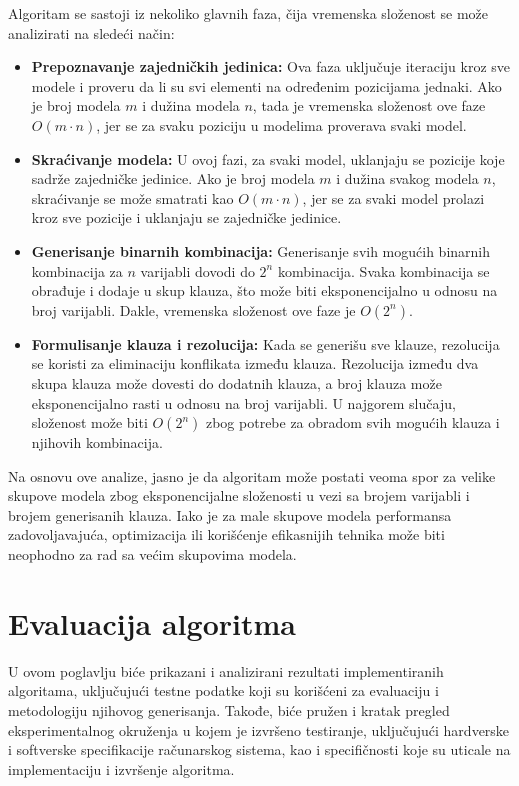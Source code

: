 \documentclass[12pt,oneside]{memoir}
\begin{document}
Algoritam se sastoji iz nekoliko glavnih faza, čija vremenska složenost se može analizirati na sledeći način:

\begin{itemize}
    \item \textbf{Prepoznavanje zajedničkih jedinica:} Ova faza uključuje iteraciju kroz sve modele i proveru da li su svi elementi na određenim pozicijama jednaki. Ako je broj modela \( m \) i dužina modela \( n \), tada je vremenska složenost ove faze \( O(m \cdot n) \), jer se za svaku poziciju u modelima proverava svaki model.
    
    \item \textbf{Skraćivanje modela:} U ovoj fazi, za svaki model, uklanjaju se pozicije koje sadrže zajedničke jedinice. Ako je broj modela \( m \) i dužina svakog modela \( n \), skraćivanje se može smatrati kao \( O(m \cdot n) \), jer se za svaki model prolazi kroz sve pozicije i uklanjaju se zajedničke jedinice.
    
    \item \textbf{Generisanje binarnih kombinacija:} Generisanje svih mogućih binarnih kombinacija za \( n \) varijabli dovodi do \( 2^n \) kombinacija. Svaka kombinacija se obrađuje i dodaje u skup klauza, što može biti eksponencijalno u odnosu na broj varijabli. Dakle, vremenska složenost ove faze je \( O(2^n) \).
    
    \item \textbf{Formulisanje klauza i rezolucija:} Kada se generišu sve klauze, rezolucija se koristi za eliminaciju konflikata između klauza. Rezolucija između dva skupa klauza može dovesti do dodatnih klauza, a broj klauza može eksponencijalno rasti u odnosu na broj varijabli. U najgorem slučaju, složenost može biti \( O(2^n) \) zbog potrebe za obradom svih mogućih klauza i njihovih kombinacija.
\end{itemize}

Na osnovu ove analize, jasno je da algoritam može postati veoma spor za velike skupove modela zbog eksponencijalne složenosti u vezi sa brojem varijabli i brojem generisanih klauza. Iako je za male skupove modela performansa zadovoljavajuća, optimizacija ili korišćenje efikasnijih tehnika može biti neophodno za rad sa većim skupovima modela.

\chapter{Evaluacija algoritma}
U ovom poglavlju biće prikazani i analizirani rezultati implementiranih algoritama, uključujući testne podatke koji su korišćeni za evaluaciju i metodologiju njihovog generisanja. Takođe, biće pružen i kratak pregled eksperimentalnog okruženja u kojem je izvršeno testiranje, uključujući hardverske i softverske specifikacije računarskog sistema, kao i specifičnosti koje su uticale na implementaciju i izvršenje algoritma.
\label{chap:algoritmi}
\end{document}
